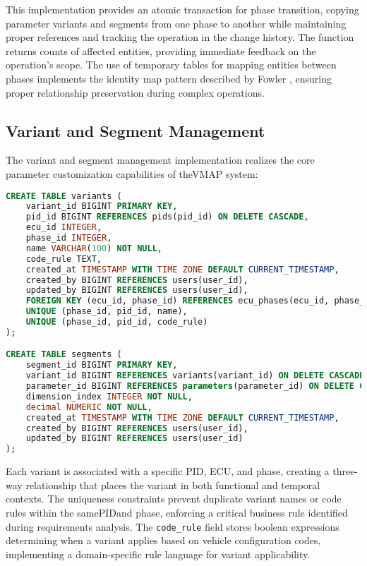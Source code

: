 This implementation provides an atomic transaction for phase transition, copying parameter variants and segments from one phase to another while maintaining proper references and tracking the operation in the change history. The function returns counts of affected entities, providing immediate feedback on the operation's scope. The use of temporary tables for mapping entities between phases implements the identity map pattern described by Fowler \cite{fowler2003patterns}, ensuring proper relationship preservation during complex operations.

\subsection{Variant and Segment Management}
\label{subsec:variant-segment-management}

The variant and segment management implementation realizes the core parameter customization capabilities of the\ac{VMAP} system:

\begin{lstlisting}[language=SQL, caption={Variant and Segment Implementation}, label={lst:variant-segment-tables}]
CREATE TABLE variants (
    variant_id BIGINT PRIMARY KEY,
    pid_id BIGINT REFERENCES pids(pid_id) ON DELETE CASCADE,
    ecu_id INTEGER,
    phase_id INTEGER,
    name VARCHAR(100) NOT NULL,
    code_rule TEXT,
    created_at TIMESTAMP WITH TIME ZONE DEFAULT CURRENT_TIMESTAMP,
    created_by BIGINT REFERENCES users(user_id),
    updated_by BIGINT REFERENCES users(user_id),
    FOREIGN KEY (ecu_id, phase_id) REFERENCES ecu_phases(ecu_id, phase_id),
    UNIQUE (phase_id, pid_id, name),
    UNIQUE (phase_id, pid_id, code_rule)
);

CREATE TABLE segments (
    segment_id BIGINT PRIMARY KEY,
    variant_id BIGINT REFERENCES variants(variant_id) ON DELETE CASCADE,
    parameter_id BIGINT REFERENCES parameters(parameter_id) ON DELETE CASCADE,
    dimension_index INTEGER NOT NULL,
    decimal NUMERIC NOT NULL,
    created_at TIMESTAMP WITH TIME ZONE DEFAULT CURRENT_TIMESTAMP,
    created_by BIGINT REFERENCES users(user_id),
    updated_by BIGINT REFERENCES users(user_id)
);
\end{lstlisting}

Each variant is associated with a specific PID, ECU, and phase, creating a three-way relationship that places the variant in both functional and temporal contexts. The uniqueness constraints prevent duplicate variant names or code rules within the same\ac{PID}and phase, enforcing a critical business rule identified during requirements analysis. The \texttt{code\_rule} field stores boolean expressions determining when a variant applies based on vehicle configuration codes, implementing a domain-specific rule language for variant applicability.

